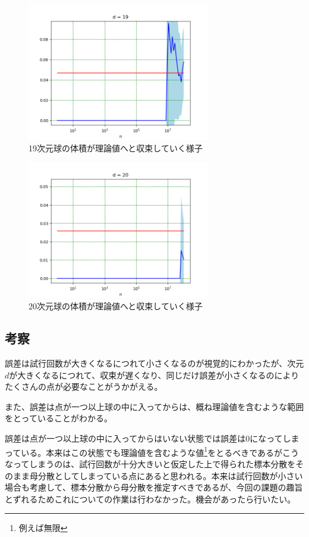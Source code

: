 \documentclass[a4paper,twoside]{jarticle}
\begin{document}
\begin{figure}[H]
\begin{center}
\includegraphics[width=8cm]{../python/report1_monte_carlo/out/r2plot19d.png}
\end{center}
\caption{19次元球の体積が理論値へと収束していく様子}
\end{figure}

\begin{figure}[H]
\begin{center}
\includegraphics[width=8cm]{../python/report1_monte_carlo/out/r2plot20d.png}
\end{center}
\caption{20次元球の体積が理論値へと収束していく様子}
\end{figure}

\subsection{考察}
誤差は試行回数が大きくなるにつれて小さくなるのが視覚的にわかったが、次元$d$が大きくなるにつれて、収束が遅くなり、同じだけ誤差が小さくなるのによりたくさんの点が必要なことがうかがえる。

また、誤差は点が一つ以上球の中に入ってからは、概ね理論値を含むような範囲をとっていることがわかる。

誤差は点が一つ以上球の中に入ってからはいない状態では誤差は0になってしまっている。本来はこの状態でも理論値を含むような値\footnote{例えば無限}をとるべきであるがこうなってしまうのは、試行回数が十分大きいと仮定した上で得られた標本分散をそのまま母分散としてしまっている点にあると思われる。本来は試行回数が小さい場合も考慮して、標本分散から母分散を推定すべきであるが、今回の課題の趣旨とずれるためこれについての作業は行わなかった。機会があったら行いたい。
\end{document}
